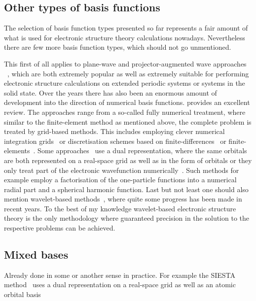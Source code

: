 




\subsection{Other types of basis functions}
The selection of basis function types presented so far
represents a fair amount of what is used for electronic structure theory
calculations nowadays.
Nevertheless there are few more basis function types,
which should not go unmentioned.

This first of all applies to
plane-wave and projector-augmented wave approaches
~\cite{Kresse1996,Kresse1999,Mortensen2005,Enkovaara2010},
which are both extremely popular as well as extremely suitable for performing
electronic structure calculations
on extended periodic systems or systems in the solid state.
Over the years there has also been an enormous amount of development
into the direction of numerical basis functions.
\citet{Frediani2015} provides an excellent review.
The approaches range from a so-called fully numerical treatment,
where similar to the finite-element method as mentioned above,
the complete problem is treated by grid-based methods.
This includes employing clever
numerical integration grids~\cite{Losilla2012DCRsp,Toivanen2015,Enkovaara2010}
or discretisation schemes
based on finite-differences~\cite{Kobus2013}
or finite-elements~\cite{Tsuchida1995,Briggs1996,Pask05,Lehtovaara2009,Alizadegan2010,Avery2011PhD,Davydov2015,Boffi2016}.
Some approaches~\cite{Soler2002} use a dual representation,
where the same orbitals are both represented on a real-space grid
as well as in the form of orbitals
or they only treat
part of the electronic wavefunction numerically~\cite{Fischer1978,LUCAS}.
Such methods for example employ a factorisation of the one-particle functions
into a numerical radial part and a spherical harmonic function.
Last but not least one should also mention
wavelet-based methods~\cite{Bischoff2011,Bischoff2012,Bischoff2013,Bischoff2014,Bischoff2014a,Bischoff2017},
where quite some progress has been made in recent years.
To the best of my knowledge wavelet-based electronic structure theory
is the only methodology where guaranteed precision in the solution to the
respective problems can be achieved.

\subsection{Mixed bases}
Already done in some or another sense in practice.
For example the SIESTA method~\cite{Soler2002} uses
a dual representation on a real-space grid as well as
an atomic orbital basis


